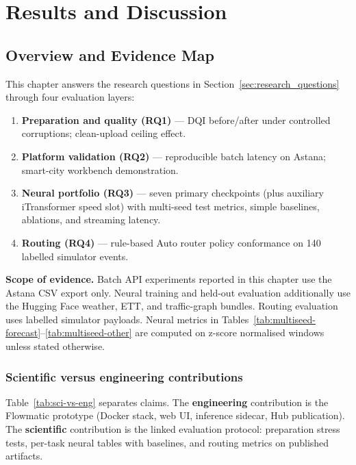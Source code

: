%
%
\chapter{Results and Discussion}
\label{chap:results}
\setlength{\parskip}{0.7em}

\section{Overview and Evidence Map}
\label{sec:exp_overview}

This chapter answers the research questions in Section~\ref{sec:research_questions} through four evaluation layers:
\begin{enumerate}
  \item \textbf{Preparation and quality (RQ1)} --- DQI before/after under controlled corruptions; clean-upload ceiling effect.
  \item \textbf{Platform validation (RQ2)} --- reproducible batch latency on Astana; smart-city workbench demonstration.
  \item \textbf{Neural portfolio (RQ3)} --- seven primary checkpoints (plus auxiliary iTransformer speed slot) with multi-seed test metrics, simple baselines, ablations, and streaming latency.
  \item \textbf{Routing (RQ4)} --- rule-based Auto router policy conformance on 140 labelled simulator events.
\end{enumerate}

\textbf{Scope of evidence.} Batch API experiments reported in this chapter use the Astana CSV export only. Neural training and held-out evaluation additionally use the Hugging Face weather, ETT, and traffic-graph bundles. Routing evaluation uses labelled simulator payloads. Neural metrics in Tables~\ref{tab:multiseed-forecast}--\ref{tab:multiseed-other} are computed on z-score normalised windows unless stated otherwise.

\subsection{Scientific versus engineering contributions}

Table~\ref{tab:sci-vs-eng} separates claims. The \textbf{engineering} contribution is the Flowmatic prototype (Docker stack, web UI, inference sidecar, Hub publication). The \textbf{scientific} contribution is the linked evaluation protocol: preparation stress tests, per-task neural tables with baselines, and routing metrics on published artifacts.

